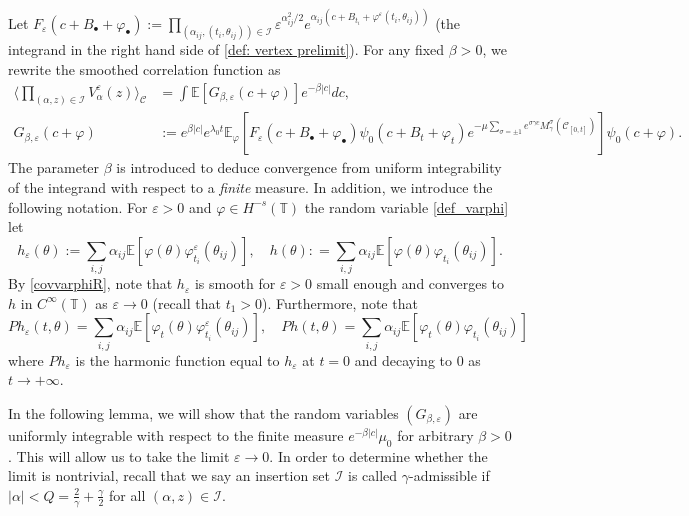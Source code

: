 \documentclass[11pt]{amsart}
\numberwithin{equation}{section}
\theoremstyle{definition}
\newcommand{\cjd}{\rangle}
\newcommand{\cjg}{\langle}
\def\E{\mathbb{E}}
\newcommand{\mc}{\mathcal}
\def\eps{\varepsilon}
\def\T{\mathbb{T}}
\begin{document}
Let $F_\eps(c+ B_\bullet + \varphi_\bullet):=\prod_{(\alpha_{ij}, (t_i, \theta_{ij})) \in \mathcal{I}}\eps^{\alpha_{ij}^2/2}e^{\alpha_{ij}(c+B_{t_i}+\varphi^{\eps}(t_i,\theta_{ij}))}$ (the integrand in the right hand side of \eqref{def: vertex prelimit}).
For any fixed $\beta > 0$, we rewrite the smoothed correlation function as 
\begin{align}
\big\cjg \prod_{(\alpha,z)\in \mc{I}}V^\eps_{\alpha}(z)\big\cjd_{\mc{C}}
&=
\int \E [ G_{\beta,\eps}(c+\varphi) ] e^{-\beta |c|}dc,  
\\
G_{\beta,\eps}(c+\varphi)
&:=
e^{\beta |c|} e^{\lambda_0 t }\mathbb E_\varphi [F_\eps(c+ B_\bullet + \varphi_\bullet) \psi_0(c+B_t+\varphi_t) e^{-\mu\sum_{\sigma = \pm 1} e^{\sigma\gamma c} M^\sigma_\gamma(\mathcal{C}_{[0,t]})}] \psi_0(c+\varphi).	
\end{align}
The parameter $\beta$ is introduced to deduce convergence from uniform integrability of the integrand with respect to a \emph{finite} measure. In addition, we introduce the following notation. For $\eps > 0$ and $\varphi\in H^{-s}(\T)$ the random variable \eqref{def_varphi}
let 
\begin{equation}\label{def_of_h}
h_\eps(\theta)
:=
\sum_{i,j} \alpha_{ij}\mathbb E[ \varphi(\theta) \varphi^\eps_{t_i}(\theta_{ij})], \quad h(\theta): = \sum_{i,j} \alpha_{ij}\mathbb E[ \varphi(\theta) \varphi_{t_i}(\theta_{ij})].
\end{equation}
By \eqref{covvarphiR}, note that $h_\eps$ is  smooth for $\eps>0$ small enough  and converges to $h$ in $C^\infty(\mathbb T)$ as $\eps \rightarrow 0$ (recall that $t_1 > 0$). Furthermore, note that 
\begin{equation}
Ph_\eps(t,\theta) = \sum_{i,j} \alpha_{ij}\mathbb E[ \varphi_t(\theta) \varphi^\eps_{t_i}(\theta_{ij})], \quad Ph(t,\theta) = \sum_{i,j} \alpha_{ij}\mathbb E[ \varphi_t(\theta) \varphi_{t_i}(\theta_{ij})]	
\end{equation}
where $Ph_{\eps}$ is the harmonic function equal to $h_\eps$ at $t=0$ and decaying to $0$ as $t\to +\infty$.

In the following lemma, we will show that the random variables $(G_{\beta,\eps})$ are uniformly integrable with respect to the finite measure $e^{-\beta |c|} \mu_0$ for arbitrary $\beta > 0$.
 This will allow us to take the limit $\eps \rightarrow 0$. In order to determine whether the limit is nontrivial, recall  that we say an insertion set $\mathcal{I}$ is called $\gamma$-admissible if $|\alpha| < Q = \frac{2}{\gamma} + \frac \gamma 2$ for all $(\alpha,z) \in \mathcal{I}$. 
\end{document}
